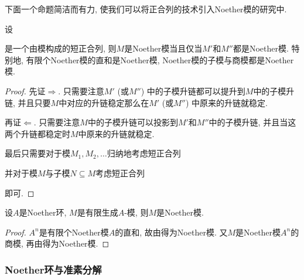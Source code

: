 下面一个命题简洁而有力, 使我们可以将正合列的技术引入Noether模的研究中.

\begin{proposition}\label{prop:noethermoduleexactsequence}
  设
  是一个由模构成的短正合列, 则$M$是Noether模当且仅当$M'$和$M''$都是Noether模. 特别地, 有限个Noether模的直和是Noether模, Noether模的子模与商模都是Noether模.
\end{proposition}

\begin{proof}
  先证$\Rightarrow$. 只需要注意$M'$ (或$M''$) 中的子模升链都可以提升到$M$中的子模升链, 并且只要$M$中对应的升链稳定那么在$M'$ (或$M''$) 中原来的升链就稳定.

  再证$\Leftarrow$. 只需要注意$M$中的子模升链可以投影到$M'$和$M''$中的子模升链, 并且当这两个升链都稳定时$M$中原来的升链就稳定.

  最后只需要对于模$M_1, M_2, \dotsc$归纳地考虑短正合列
  并对于模$M$与子模$N\subseteq M$考虑短正合列
  即可.
\end{proof}

\begin{proposition}\label{prop:fgmoduleovernoetherring}
  设$A$是Noether环, $M$是有限生成$A$-模, 则$M$是Noether模.
\end{proposition}

\begin{proof}
  $A^n$是有限个Noether模$A$的直和, 故由得为Noether模. 又$M$是Noether模$A^n$的商模, 再由得为Noether模.
\end{proof}

\subsubsection{Noether环与准素分解}\label{sec:algebra-primdecom}

